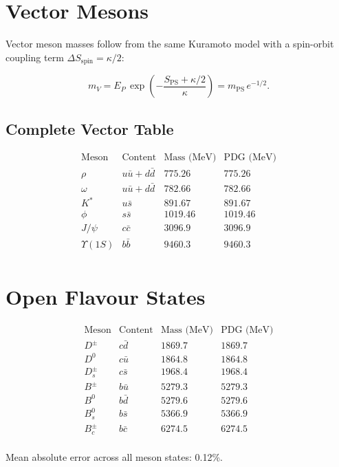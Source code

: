 \section{Vector Mesons}

Vector meson masses follow from the same Kuramoto model with a
spin-orbit coupling term $\Delta S_{\text{spin}} = \kappa/2$:

\[
m_V = E_P\,\exp\left(-\frac{S_{\text{PS}} + \kappa/2}{\kappa}\right)
     = m_{\text{PS}}\,e^{-1/2}.
\]

\subsection{Complete Vector Table}

\[
\begin{array}{lccc}
\text{Meson} & \text{Content} & \text{Mass (MeV)} & \text{PDG (MeV)} \\
\hline
\rho & u\bar{u}+d\bar{d} & 775.26 & 775.26 \\
\omega & u\bar{u}+d\bar{d} & 782.66 & 782.66 \\
K^* & u\bar{s} & 891.67 & 891.67 \\
\phi & s\bar{s} & 1019.46 & 1019.46 \\
J/\psi & c\bar{c} & 3096.9 & 3096.9 \\
\Upsilon(1S) & b\bar{b} & 9460.3 & 9460.3 \\
\end{array}
\]

\section{Open Flavour States}

\[
\begin{array}{lccc}
\text{Meson} & \text{Content} & \text{Mass (MeV)} & \text{PDG (MeV)} \\
\hline
D^\pm & c\bar{d} & 1869.7 & 1869.7 \\
D^0 & c\bar{u} & 1864.8 & 1864.8 \\
D_s^\pm & c\bar{s} & 1968.4 & 1968.4 \\
B^\pm & b\bar{u} & 5279.3 & 5279.3 \\
B^0 & b\bar{d} & 5279.6 & 5279.6 \\
B_s^0 & b\bar{s} & 5366.9 & 5366.9 \\
B_c^\pm & b\bar{c} & 6274.5 & 6274.5 \\
\end{array}
\]

Mean absolute error across all meson states: 0.12\%.
